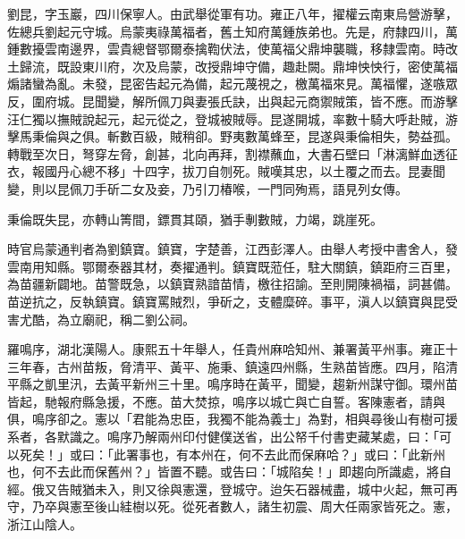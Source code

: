 \begin{pinyinscope}
劉昆，字玉巖，四川保寧人。由武舉從軍有功。雍正八年，擢權云南東烏營游擊，佐總兵劉起元守城。烏蒙夷祿萬福者，舊土知府萬鍾族弟也。先是，府隸四川，萬鍾數擾雲南邊界，雲貴總督鄂爾泰擒鞫伏法，使萬福父鼎坤襲職，移隸雲南。時改土歸流，既設東川府，次及烏蒙，改授鼎坤守備，趣赴闕。鼎坤怏怏行，密使萬福煽諸蠻為亂。未發，昆密告起元為備，起元蔑視之，檄萬福來見。萬福懼，遂嗾眾反，圍府城。昆聞變，解所佩刀與妻張氏訣，出與起元商禦賊策，皆不應。而游擊汪仁獨以撫賊說起元，起元從之，登城被賊辱。昆遂開城，率數十騎大呼赴賊，游擊馬秉倫與之俱。斬數百級，賊稍卻。野夷數萬蜂至，昆遂與秉倫相失，勢益孤。轉戰至次日，弩穿左脅，創甚，北向再拜，割襟蘸血，大書石壁曰「淋漓鮮血透征衣，報國丹心總不移」十四字，拔刀自刎死。賊嘆其忠，以土覆之而去。昆妻聞變，則以昆佩刀手斫二女及妾，乃引刀椿喉，一門同殉焉，語見列女傳。

秉倫既失昆，亦轉山箐間，鏢貫其頤，猶手剸數賊，力竭，跳崖死。

時官烏蒙通判者為劉鎮寶。鎮寶，字楚善，江西彭澤人。由舉人考授中書舍人，發雲南用知縣。鄂爾泰器其材，奏擢通判。鎮寶既蒞任，駐大關鎮，鎮距府三百里，為苗疆新闢地。苗警既急，以鎮寶熟諳苗情，檄往招諭。至則開陳禍福，詞甚備。苗逆抗之，反執鎮寶。鎮寶罵賊烈，爭斫之，支體糜碎。事平，滇人以鎮寶與昆受害尤酷，為立廟祀，稱二劉公祠。

羅鳴序，湖北漢陽人。康熙五十年舉人，任貴州麻哈知州、兼署黃平州事。雍正十三年春，古州苗叛，脅清平、黃平、施秉、鎮遠四州縣，生熟苗皆應。四月，陷清平縣之凱里汛，去黃平新州三十里。鳴序時在黃平，聞變，趨新州謀守御。環州苗皆起，馳報府縣急援，不應。苗大焚掠，鳴序以城亡與亡自誓。客陳憲者，請與俱，鳴序卻之。憲以「君能為忠臣，我獨不能為義士」為對，相與尋後山有樹可援系者，各默識之。鳴序乃解兩州印付健僕送省，出公帑千付書吏藏某處，曰：「可以死矣！」或曰：「此署事也，有本州在，何不去此而保麻哈？」或曰：「此新州也，何不去此而保舊州？」皆置不聽。或告曰：「城陷矣！」即趨向所識處，將自經。俄又告賊猶未入，則又徐與憲還，登城守。迨矢石器械盡，城中火起，無可再守，乃卒與憲至後山絓樹以死。從死者數人，諸生初震、周大任兩家皆死之。憲，浙江山陰人。


\end{pinyinscope}